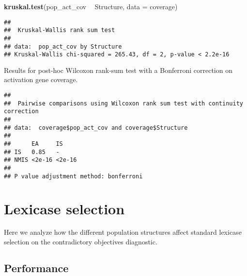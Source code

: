 \documentclass[]{book}
\newenvironment{Shaded}{\begin{snugshade}}{\end{snugshade}}
\newcommand{\DataTypeTok}[1]{\textcolor[rgb]{0.13,0.29,0.53}{#1}}
\newcommand{\KeywordTok}[1]{\textcolor[rgb]{0.13,0.29,0.53}{\textbf{#1}}}
\newcommand{\NormalTok}[1]{#1}
\newcommand{\OperatorTok}[1]{\textcolor[rgb]{0.81,0.36,0.00}{\textbf{#1}}}
\newcommand{\OtherTok}[1]{\textcolor[rgb]{0.56,0.35,0.01}{#1}}
\newcommand{\StringTok}[1]{\textcolor[rgb]{0.31,0.60,0.02}{#1}}
\begin{document}
\begin{Shaded}
\begin{Highlighting}[]
\KeywordTok{kruskal.test}\NormalTok{(pop_act_cov }\OperatorTok{~}\StringTok{ }\NormalTok{Structure, }\DataTypeTok{data =}\NormalTok{ coverage)}
\end{Highlighting}
\end{Shaded}

\begin{verbatim}
## 
##  Kruskal-Wallis rank sum test
## 
## data:  pop_act_cov by Structure
## Kruskal-Wallis chi-squared = 265.43, df = 2, p-value < 2.2e-16
\end{verbatim}

Results for post-hoc Wilcoxon rank-sum test with a Bonferroni correction on activation gene coverage.

\begin{Shaded}
\end{Shaded}

\begin{verbatim}
## 
##  Pairwise comparisons using Wilcoxon rank sum test with continuity correction 
## 
## data:  coverage$pop_act_cov and coverage$Structure 
## 
##      EA     IS    
## IS   0.85   -     
## NMIS <2e-16 <2e-16
## 
## P value adjustment method: bonferroni
\end{verbatim}

\hypertarget{lexicase-selection-11}{%
\section{Lexicase selection}\label{lexicase-selection-11}}

Here we analyze how the different population structures affect standard lexicase selection on the contradictory objectives diagnostic.

\hypertarget{performance-8}{%
\subsection{Performance}\label{performance-8}}
\end{document}
